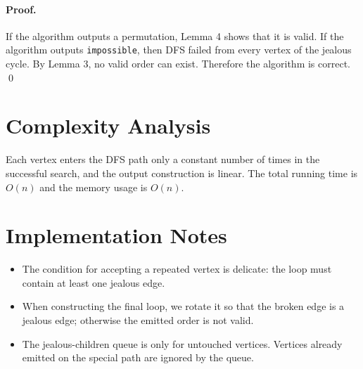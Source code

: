 \documentclass[11pt]{article}
\begin{document}
\paragraph{Proof.}
If the algorithm outputs a permutation, Lemma 4 shows that it is valid. If the algorithm outputs \texttt{impossible}, then DFS failed from every vertex of the jealous cycle. By Lemma 3, no valid order can exist. Therefore the algorithm is correct. \qed

\section*{Complexity Analysis}

Each vertex enters the DFS path only a constant number of times in the successful search, and the output construction is linear. The total running time is $O(n)$ and the memory usage is $O(n)$.

\section*{Implementation Notes}

\begin{itemize}[leftmargin=*]
    \item The condition for accepting a repeated vertex is delicate: the loop must contain at least one jealous edge.
    \item When constructing the final loop, we rotate it so that the broken edge is a jealous edge; otherwise the emitted order is not valid.
    \item The jealous-children queue is only for untouched vertices. Vertices already emitted on the special path are ignored by the queue.
\end{itemize}
\end{document}
